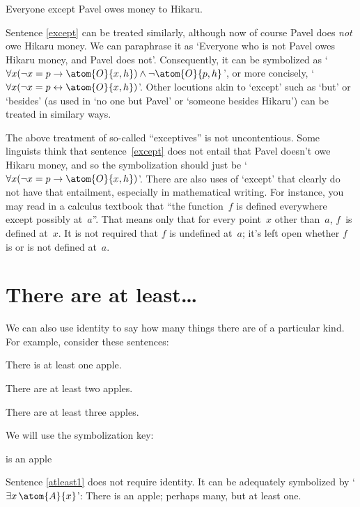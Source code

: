 \begin{earg}
	\item[\ex{except}] Everyone except Pavel owes money to Hikaru.
	\end{earg}
Sentence \ref{except} can be treated similarly, although now of course Pavel does \emph{not} owe Hikaru money. We can paraphrase it as `Everyone who is not Pavel owes Hikaru money, and Pavel does not'. Consequently, it can be symbolized as `$\forall x(\enot x = p \eif \atom{O}{x,h}) \eand \enot \atom{O}{p,h}$', or more concisely, `$\forall x(\enot x = p \eiff \atom{O}{x,h})$'. Other locutions akin to `except' such as `but' or `besides' (as used in `no one but Pavel' or `someone besides Hikaru') can be treated in similary ways.

The above treatment of so-called ``exceptives'' is not uncontentious. Some linguists think that sentence~\ref{except} does not entail that Pavel doesn't owe Hikaru money, and so the symbolization should just be `$\forall x(\enot x = p \eif \atom{O}{x,h})$'.  There are also uses of `except' that clearly do not have that entailment, especially in mathematical writing.  For instance, you may read in a calculus textbook that ``the function~$f$ is defined everywhere except possibly at~$a$''.  That means only that for every point~$x$ other than~$a$, $f$~is defined at~$x$. It is not required that $f$ is undefined at~$a$; it's left open whether $f$ is or is not defined at~$a$.

\section{There are at least\ldots}
We can also use identity to say how many things there are of a particular kind. For example, consider these sentences:
\begin{earg}
\item[\ex{atleast1}] There is at least one apple.
\item[\ex{atleast2}] There are at least two apples.
\item[\ex{atleast3}] There are at least three apples.
\end{earg}
We will use the symbolization key:
	\begin{ekey}
		\item[\atom{A}{x}]  is an apple
	\end{ekey}
Sentence \ref{atleast1} does not require identity. It can be adequately symbolized by `$\exists x\, \atom{A}{x}$': There is an apple; perhaps many, but at least one.

